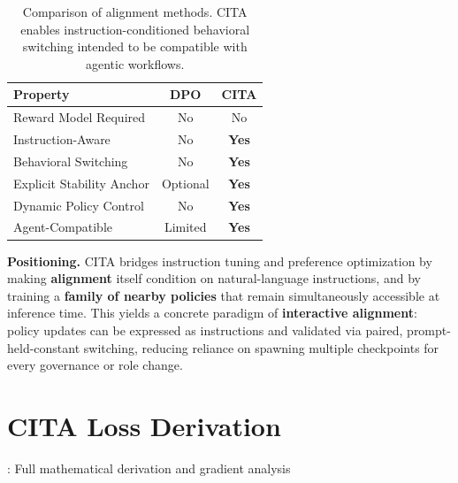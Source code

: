 \vspace{-2mm}
\begin{table}[H]
\centering
\small
\renewcommand{\arraystretch}{1.2}
\begin{tabular}{@{}lcc@{}}
\toprule
\textbf{Property} & \textbf{DPO} & \textbf{CITA} \\
\midrule
Reward Model Required & No & No \\ \hline
Instruction-Aware & No & \textbf{Yes} \\ \hline
Behavioral Switching & No & \textbf{Yes} \\ \hline
Explicit Stability Anchor & Optional & \textbf{Yes} \\ \hline
Dynamic Policy Control & No & \textbf{Yes} \\ \hline
Agent-Compatible & Limited & \textbf{Yes} \\
\bottomrule
\end{tabular}
\caption{Comparison of alignment methods. CITA enables instruction-conditioned behavioral switching intended to be compatible with agentic workflows.}
\label{tab:method_comparison}
\vspace{-4mm}
\end{table}

\noindent\textbf{Positioning.}
CITA bridges instruction tuning and preference optimization by making \textbf{alignment} itself condition on natural-language instructions, and by training a \textbf{family of nearby policies} that remain simultaneously accessible at inference time. This yields a concrete paradigm of \textbf{interactive alignment}: policy updates can be expressed as instructions and validated via paired, prompt-held-constant switching, reducing reliance on spawning multiple checkpoints for every governance or role change.





\section{CITA Loss Derivation}: Full mathematical derivation and gradient analysis

\vspace{-0.35em}
